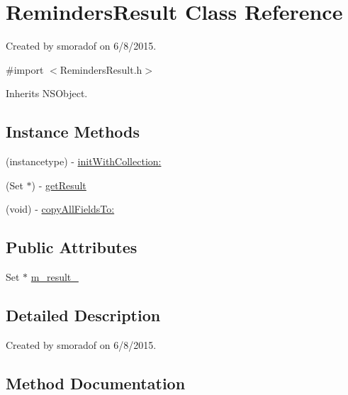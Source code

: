 \hypertarget{interface_reminders_result}{}\section{Reminders\+Result Class Reference}
\label{interface_reminders_result}


Created by smoradof on 6/8/2015.  




{\ttfamily \#import $<$Reminders\+Result.\+h$>$}



Inherits N\+S\+Object.

\subsection*{Instance Methods}
\begin{DoxyCompactItemize}
\item 
(instancetype) -\/ \hyperlink{interface_reminders_result_a89e45e90e612594865fbb6203b7c8e29}{init\+With\+Collection\+:}
\item 
(Set $\ast$) -\/ \hyperlink{interface_reminders_result_a07c9e4ff7c9c498cf0faaed93aa52ce4}{get\+Result}
\item 
(void) -\/ \hyperlink{interface_reminders_result_a0fce0521c0079f164519769b3056204f}{copy\+All\+Fields\+To\+:}
\end{DoxyCompactItemize}
\subsection*{Public Attributes}
\begin{DoxyCompactItemize}
\item 
Set $\ast$ \hyperlink{interface_reminders_result_a65a7f0e499f7c9e56b99e9b7befe14ea}{m\+\_\+result\+\_\+}
\end{DoxyCompactItemize}


\subsection{Detailed Description}
Created by smoradof on 6/8/2015. 

\subsection{Method Documentation}
\hypertarget{interface_reminders_result_a0fce0521c0079f164519769b3056204f}{}
